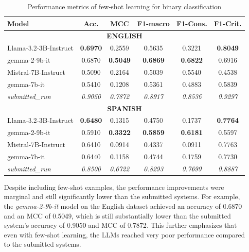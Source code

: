 \documentclass{Configuration_Files/PoliMi3i_thesis}
\begin{document}
\begin{table}[h]
    \centering
    \begin{tabular}{lccccc}
        \hline
        \textbf{Model} & \textbf{Acc.} & \textbf{MCC} & \textbf{F1-macro} & \textbf{F1-Cons.} & \textbf{F1-Crit.}   \\
        \hline
        \multicolumn{6}{c}{\textbf{ENGLISH}} \\
        \hline
        Llama-3.2-3B-Instruct & \textbf{0.6970} & 0.2559 & 0.5635 & 0.3221  & \textbf{0.8049}  \\
        gemma-2-9b-it         & 0.6870 & \textbf{0.5049} & \textbf{0.6869} & \textbf{0.6822} & 0.6916   \\
        Mistral-7B-Instruct   & 0.5090 & 0.2164 & 0.5039 & 0.5540 & 0.4538   \\
        gemma-7b-it           & 0.5410 & 0.1208 & 0.5361 & 0.4883 & 0.5839   \\
        \hline
        \textit{submitted\_run} & \textit{0.9050} & \textit{0.7872} & \textit{0.8917} & \textit{0.8536} & \textit{0.9297}   \\
        \hline
        \hline
        \multicolumn{6}{c}{\textbf{SPANISH}} \\
        \hline
        Llama-3.2-3B-Instruct & \textbf{0.6480} & 0.1315 & 0.4750 & 0.1737  & \textbf{0.7764}  \\
        gemma-2-9b-it         & 0.5910 & \textbf{0.3322} & \textbf{0.5859} & \textbf{0.6181} & 0.5597   \\
        Mistral-7B-Instruct   & 0.6410 & 0.0914 & 0.4337 & 0.0911 & 0.7763   \\
        gemma-7b-it           & 0.6440 & 0.1158 & 0.4744 & 0.1759 & 0.7730   \\
        \hline
        \textit{submitted\_run} & \textit{0.8500} & \textit{0.6722}  & \textit{0.8293} & \textit{0.7699} & \textit{0.8887}   \\
        \hline
    \end{tabular}
    \caption{Performance metrics of few-shot learning for binary classification}
    \label{tab:performance_llms_T1_few_shots_text_gen}
\end{table}
\FloatBarrier


Despite including few-shot examples, the performance improvements were marginal and still significantly lower than the submitted systems. For example, the \textit{gemma-2-9b-it} model on the English dataset achieved an accuracy of 0.6870 and an MCC of 0.5049, which is still substantially lower than the submitted system's accuracy of 0.9050 and MCC of 0.7872. This further emphasizes that even with few-shot learning, the LLMs reached very poor performance compared to the submitted systems. 
\end{document}
